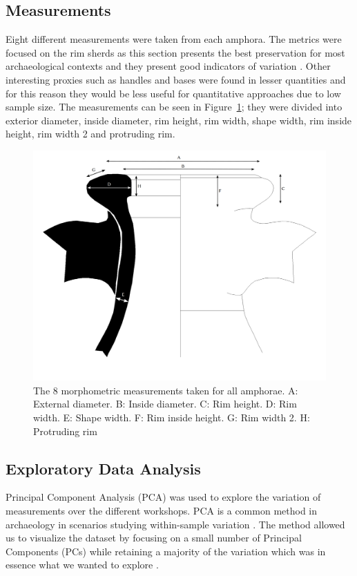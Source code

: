 \documentclass[review]{elsarticle}
\begin{document}
\subsection{Measurements}

Eight different measurements were taken from each amphora. The metrics were focused on the rim sherds as this section presents the best preservation for most archaeological contexts and they present good indicators of variation \citep{berni_millet_epigrafianforica_2008}. Other interesting proxies such as handles and bases were found in lesser quantities and for this reason they would be less useful for quantitative approaches due to low sample size. The measurements can be seen in Figure~\ref{mesures}; they were divided into exterior diameter, inside diameter, rim height, rim width, shape width, rim inside height, rim width 2 and protruding rim.

\begin{figure}[htp]
	\centering
\includegraphics[width=\linewidth]{figs/mesures.pdf}
\caption{The 8 morphometric measurements taken for all amphorae. A: External diameter. B: Inside diameter. C: Rim height. D: Rim width. E: Shape width. F: Rim inside height. G: Rim width 2. H: Protruding rim}
\label{mesures}
\end{figure} 

\subsection{Exploratory Data Analysis}

Principal Component Analysis (PCA) was used to explore the variation of measurements over the different workshops. PCA is a common method in archaeology in scenarios studying within-sample variation \citep{ shennan_quantifying_1997, li_crossbows_2014, schillinger_differences_2016}. The method allowed us to visualize the dataset by focusing on a small number of Principal Components (PCs) while retaining a majority of the variation which was in essence what we wanted to explore \citep{jolliffe_principal_2002}. 
\end{document}
